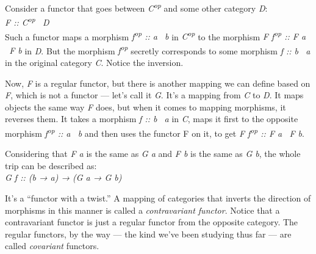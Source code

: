Consider a functor that goes between \emph{C\textsuperscript{op}} and
some other category \emph{D}:\\
\emph{F :: C\textsuperscript{op} \to\ D}\\
Such a functor maps a morphism \emph{f\textsuperscript{op} :: a \to\ b} in
\emph{C\textsuperscript{op}} to the morphism \emph{F
f\textsuperscript{op} :: F a \to\ F b} in \emph{D}. But the morphism
\emph{f\textsuperscript{op}} secretly corresponds to some morphism
\emph{f :: b \to\ a} in the original category \emph{C}. Notice the
inversion.

Now, \emph{F} is a regular functor, but there is another mapping we can
define based on \emph{F}, which is not a functor --- let's call it
\emph{G}. It's a mapping from \emph{C} to \emph{D}. It maps objects the
same way \emph{F} does, but when it comes to mapping morphisms, it
reverses them. It takes a morphism \emph{f :: b \to\ a} in \emph{C}, maps
it first to the opposite morphism \emph{f\textsuperscript{op} :: a \to\ b}
and then uses the functor F on it, to get \emph{F f\textsuperscript{op}
:: F a \to\ F b}.

Considering that \emph{F a} is the same as \emph{G a} and \emph{F b} is
the same as \emph{G b}, the whole trip can be described as:\\
\emph{G f :: (b → a) → (G a → G b)}

It's a ``functor with a twist.'' A mapping of categories that inverts
the direction of morphisms in this manner is called a
\emph{contravariant functor}. Notice that a contravariant functor is
just a regular functor from the opposite category. The regular functors,
by the way --- the kind we've been studying thus far --- are called
\emph{covariant} functors.

\begin{figure}[H]
\centering
{}
\end{figure}

